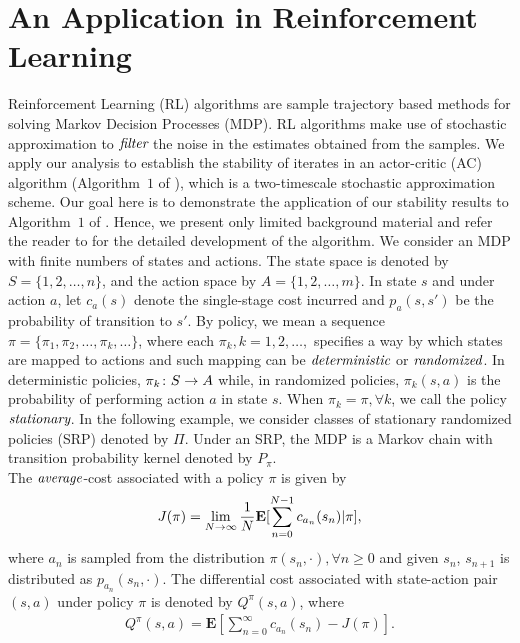 \section{An Application in Reinforcement Learning}\label{example}
Reinforcement Learning (RL) algorithms are sample trajectory based methods for solving Markov Decision Processes (MDP). RL algorithms make use of stochastic approximation to $\emph{filter}$ the noise in the estimates obtained from the samples. We apply our analysis to establish the stability of iterates in an actor-critic (AC) algorithm ({Algorithm~$1$} of \cite{NAC}), which is a two-timescale stochastic approximation scheme. Our goal here is to demonstrate the application of our stability results to Algorithm~$1$ of \cite{NAC}. Hence, we present only limited background material and refer the reader to \cite{NAC} for the detailed development of the algorithm. We consider an MDP with finite numbers of states and actions. The state space is denoted by 
$S=\{1,2,\ldots,n\}$, and the action space by $A=\{1,2,\ldots,m\}$. In state $s$ and under action $a$, 
let $c_a(s)$ denote the single-stage cost incurred and $p_a(s,s')$ be the probability of transition to 
$s'$. By policy, we mean a sequence $\pi=\{\pi_1, \pi_2, \ldots, \pi_k, \ldots\}$, 
where each $\pi_k,k=1,2,\ldots,$ specifies a way by which states are mapped to actions and such mapping 
can be $\emph{deterministic}$  or $\emph{randomized}$. In deterministic policies, $\pi_k \colon S \rightarrow A$
while, in randomized policies, $\pi_k(s,a)$ is the probability of performing action $a$ in state $s$. 
When $\pi_k=\pi, \forall k$, we call the policy $\emph{stationary}$. In the following example, we consider 
classes of stationary randomized policies (SRP) denoted by $\Pi$. Under an SRP, the MDP is a Markov chain 
with transition probability kernel denoted by $P_\pi$.\\
\indent The $\emph{average}$-cost associated with a policy $\pi$ is given by
\begin{align}
J(\pi)=\lim_{N\rightarrow \infty}\frac{1}{N}\mathbf{E}[\sum_{n=0}^{N-1} c_{a_n}(s_n)|\pi],
\end{align}
where $a_n$ is sampled from the distribution $\pi(s_n,\cdot), \forall n\geq 0$ and given $s_n$, $s_{n+1}$ is distributed as $p_{a_n}(s_n,\cdot)$. 
The differential cost associated with state-action pair $(s,a)$ under policy $\pi$ is denoted by $Q^\pi(s,a)$, where
\begin{align}
Q^\pi(s,a)=\mathbf{E}[\sum_{n=0}^\infty c_{a_n}(s_n)-J(\pi)].
\end{align}
